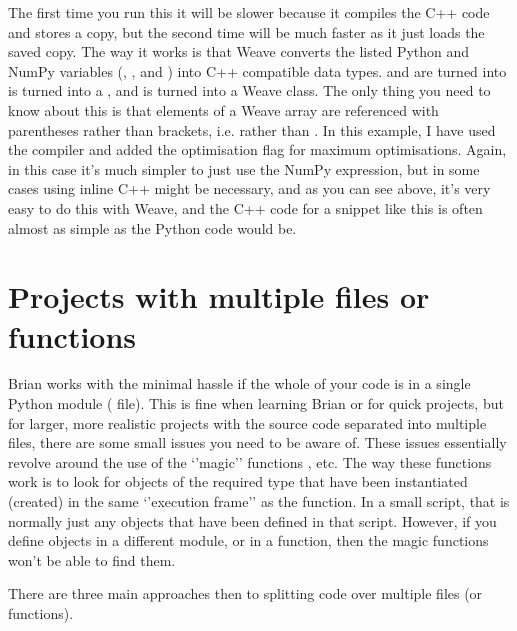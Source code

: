 \documentclass[letterpaper,10pt]{manual}
\begin{document}
The first time you run this it will be slower because it compiles the
C++ code and stores a copy, but the second time will be much faster as
it just loads the saved copy. The way it works is that Weave converts
the listed Python and NumPy variables (, , 
and ) into C++ compatible data types.  and
 are turned into  is turned into
a , and  is turned into a Weave
 class. The only thing you need to know about this is that
elements of a Weave array are referenced with parentheses rather than
brackets, i.e.  rather than . In
this example, I have used the  compiler and added the optimisation
flag  for maximum optimisations. Again, in this case it's much
simpler to just use the  NumPy expression,
but in some cases using inline C++ might be necessary, and as you can see
above, it's very easy to do this with Weave, and the C++ code for a
snippet like this is often almost as simple as the Python code would be.

\resetcurrentobjects
{}

\hypertarget{projects-with-multiple-files}{}\section{Projects with multiple files or functions}

Brian works with the minimal hassle if the whole of your code is in a
single Python module ( file). This is fine when learning Brian
or for quick projects, but for larger, more realistic projects with
the source code separated into multiple files, there are some small
issues you need to be aware of. These issues essentially revolve
around the use of the `'magic'' functions \hyperlink{brian.run}{}, etc. The way
these functions work is to look for objects of the required type that
have been instantiated (created) in the same `'execution frame'' as
the \hyperlink{brian.run}{} function. In a small script, that is normally just
any objects that have been defined in that script. However, if you
define objects in a different module, or in a function, then the
magic functions won't be able to find them.

There are three main approaches then to splitting code over multiple
files (or functions).
\end{document}
